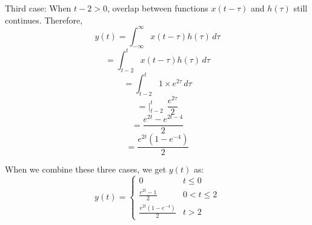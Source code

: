 \documentclass[10pt,a4paper, margin=1in]{article}
\begin{document}
\begin{enumerate}
\begin{enumerate}
 Third case: When $t-2>0$, overlap between functions $x(t-\tau)$ and $h(\tau)$ still continues. Therefore, \\
 \[y(t) =  \int_{- \infty}^{\infty} x(t-\tau)h(\tau) \,d\tau   \]
 \[=  \int_{t-2}^{t} x(t-\tau)h(\tau) \,d\tau   \]
 \[=  \int_{t-2}^{t} 1 \times e^{2\tau} \,d\tau   \]
 \[=  |_{t-2}^t \ \ \frac{e^{2\tau}}{2}   \]
 \[=  \frac{e^{2t} - e^{2t-4}}{2}  \]
 \[=  \frac{e^{2t}(1 - e^{-4})}{2}  \]
 
 When we combine these three cases, we get $y(t)$ as: \\
 
  \[y(t) = \begin{cases} 
      0 & t \leq 0 \\
      \frac{e^{2t} - 1}{2} &  0 < t \leq 2 \\
      \frac{e^{2t}(1 - e^{-4})}{2} & t > 2 
   \end{cases}
\]

    
    \end{enumerate}


\end{enumerate}
\end{document}

